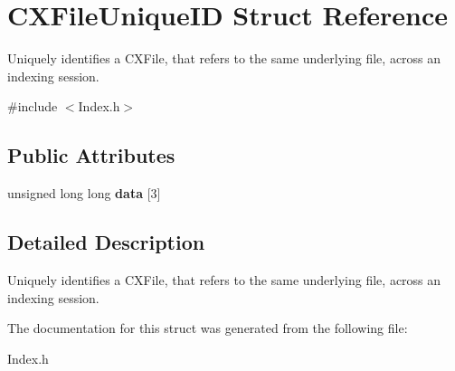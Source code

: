 \hypertarget{structCXFileUniqueID}{}\section{C\+X\+File\+Unique\+ID Struct Reference}
\label{structCXFileUniqueID}


Uniquely identifies a C\+X\+File, that refers to the same underlying file, across an indexing session.  




{\ttfamily \#include $<$Index.\+h$>$}

\subsection*{Public Attributes}
\begin{DoxyCompactItemize}
\item 
\mbox{\label{structCXFileUniqueID_a70e0de6a7bf284b0cd738e0784c464ef}} 
unsigned long long {\bfseries data} \mbox{[}3\mbox{]}
\end{DoxyCompactItemize}


\subsection{Detailed Description}
Uniquely identifies a C\+X\+File, that refers to the same underlying file, across an indexing session. 

The documentation for this struct was generated from the following file\+:\begin{DoxyCompactItemize}
\item 
Index.\+h\end{DoxyCompactItemize}
